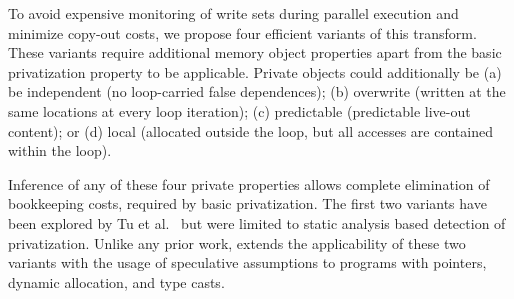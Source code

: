 To avoid expensive monitoring of write sets during parallel execution
and minimize copy-out costs, we propose four efficient variants of
this transform.
%
These variants require additional memory object properties apart from the basic
privatization property to be applicable.  Private
objects could additionally be (a) be independent (no loop-carried false
dependences); (b) overwrite (written at the same locations at every
loop iteration); (c) predictable (predictable live-out content);
or (d) local (allocated outside the loop, but all accesses are
contained within the loop).

Inference of any of these four private properties allows complete
elimination of bookkeeping costs, required by basic privatization.
The first two variants have been explored by Tu et
al.~\cite{tu:94:lcpc} but were limited to static analysis based
detection of privatization. Unlike any prior work, \name extends
the applicability of these two variants with the usage of speculative
assumptions to programs with pointers, dynamic allocation, and type
casts.





\lstset{basicstyle=\ttfamily, numbers=left, numberstyle=\tiny,
  stepnumber=1, numbersep=5pt}

